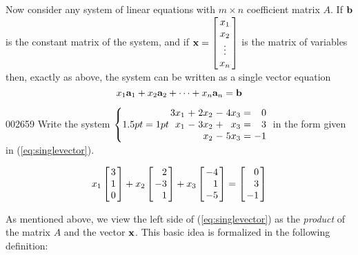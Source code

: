 Now consider any system of linear equations with $m \times n$ coefficient matrix $A$. If $\textbf{b}$ is the constant matrix of the system, and if $\vect{x} = \leftB \begin{array}{c}
x_{1} \\
x_{2} \\
\vdots \\
x_{n}
\end{array} \rightB$
 is the matrix of variables then, exactly as above, the system can be written as a single vector equation
\begin{equation} \label{eq:singlevector}
x_{1}\textbf{a}_{1} + x_{2}\textbf{a}_{2} + \dots + x_{n}\textbf{a}_{n} = \textbf{b}
\end{equation}
\begin{example}{}{002659}
Write the system 
$\left\lbrace
\arraycolsep=1pt
\begin{array}{rrrrrrr}
3x_{1} & + & 2x_{2} & - & 4x_{3} & = & 0 \\
x_{1} & - & 3x_{2} & + & x_{3} & = & 3 \\
& & x_{2} & - & 5x_{3} & = & -1
\end{array} \right.$
 in the form given in  (\ref{eq:singlevector}).


\begin{solution}
\begin{equation*}
x_{1} \leftB \begin{array}{r}
3 \\
1 \\
0
\end{array} \rightB + 
x_{2} \leftB \begin{array}{r}
2 \\
-3 \\
1
\end{array} \rightB + 
x_{3} \leftB \begin{array}{r}
-4 \\
1 \\
-5
\end{array} \rightB =
\leftB \begin{array}{r}
0 \\
3 \\
-1
\end{array} \rightB
\end{equation*}
\end{solution}
\end{example}

As mentioned above, we view the left side of (\ref{eq:singlevector}) as the \textit{product} of the matrix $A$ and the vector $\textbf{x}$. This basic idea is formalized in the following definition:


